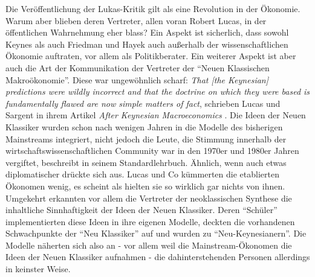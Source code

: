 Die Veröffentlichung der Lukas-Kritik gilt als eine Revolution in der Ökonomie. Warum aber blieben deren Vertreter, allen voran Robert Lucas, in der öffentlichen Wahrnehmung eher blass? Ein Aspekt ist sicherlich, dass sowohl Keynes als auch Friedman und Hayek auch außerhalb der wissenschaftlichen Ökonomie auftraten, vor allem als Politikberater. Ein weiterer Aspekt ist aber auch die Art der Kommunikation der Vertreter der "`Neuen Klassischen Makroökonomie"'. Diese war ungewöhnlich scharf: \textit{That [the Keynesian] predictions were wildly incorrect and that the doctrine on which they were based is fundamentally flawed are now simple matters of fact}, schrieben Lucas und Sargent in ihrem Artikel \textit{After Keynesian Macroeconomics} \parencite[S. 1]{Lucas1979}. Die Ideen der Neuen Klassiker wurden schon nach wenigen Jahren in die Modelle des bisherigen Mainstreams integriert, nicht jedoch die Leute, die Stimmung innerhalb der wirtschaftswissenschaftlichen Community war in den 1970er und 1980er Jahren vergiftet, beschreibt \cite{Blanchard2003} in seinem Standardlehrbuch. Ähnlich, wenn auch etwas diplomatischer drückte sich \cite{Samuelson1998} aus. Lucas und Co kümmerten die etablierten Ökonomen wenig, es scheint als hielten sie so wirklich gar nichts von ihnen. Umgekehrt erkannten vor allem die Vertreter der neoklassischen Synthese die inhaltliche Sinnhaftigkeit der Ideen der Neuen Klassiker. Deren "`Schüler"' implementierten diese Ideen in ihre eigenen Modelle, deckten die vorhandenen Schwachpunkte der "`Neu Klassiker"' auf und wurden zu "`Neu-Keynesianern"'. Die Modelle näherten sich also an - vor allem weil die Mainstream-Ökonomen die Ideen der Neuen Klassiker aufnahmen - die dahinterstehenden Personen allerdings in keinster Weise. 

